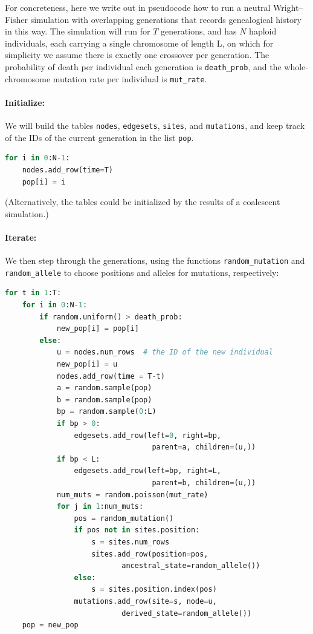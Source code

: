 \documentclass{article}
\newcommand{\nodes}{\texttt{nodes}}
\newcommand{\edgesets}{\texttt{edgesets}}
\newcommand{\sites}{\texttt{sites}}
\newcommand{\mutations}{\texttt{mutations}}
\begin{document}
For concreteness, here we write out in pseudocode
how to run a neutral Wright--Fisher simulation
with overlapping generations
that records genealogical history in this way.
The simulation will run for $T$ generations,
and has $N$ haploid individuals, each carrying a single chromosome of length L,
on which for simplicity we assume there is exactly one crossover per generation.
The probability of death per individual each generation is \texttt{death\_prob},
and the whole-chromosome mutation rate per individual is \texttt{mut\_rate}.

\paragraph{Initialize:}
We will build the tables \nodes, \edgesets, \sites, and \mutations,
and keep track of the IDs of the current generation in the list \texttt{pop}.
\begin{lstlisting}[language=Python]
for i in 0:N-1:
    nodes.add_row(time=T)
    pop[i] = i
\end{lstlisting}
(Alternatively, the tables could be initialized by the results of a coalescent simulation.)

\paragraph{Iterate:}
We then step through the generations,
using the functions \texttt{random\_mutation} and \texttt{random\_allele}
to choose positions and alleles for mutations, respectively:
\begin{lstlisting}[language=Python]
for t in 1:T:
    for i in 0:N-1:
        if random.uniform() > death_prob:
            new_pop[i] = pop[i]
        else:
            u = nodes.num_rows  # the ID of the new individual
            new_pop[i] = u
            nodes.add_row(time = T-t)
            a = random.sample(pop)
            b = random.sample(pop)
            bp = random.sample(0:L)
            if bp > 0:
                edgesets.add_row(left=0, right=bp,
                                  parent=a, children=(u,))
            if bp < L:
                edgesets.add_row(left=bp, right=L,
                                  parent=b, children=(u,))
            num_muts = random.poisson(mut_rate)
            for j in 1:num_muts:
                pos = random_mutation()
                if pos not in sites.position:
                    s = sites.num_rows
                    sites.add_row(position=pos,
                           ancestral_state=random_allele())
                else:
                    s = sites.position.index(pos)
                mutations.add_row(site=s, node=u,
                           derived_state=random_allele())
    pop = new_pop
\end{lstlisting}
\end{document}
